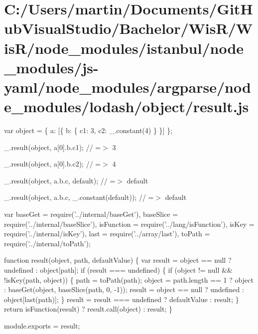 \hypertarget{_c_1_2_users_2martin_2_documents_2_git_hub_visual_studio_2_bachelor_2_wis_r_2_wis_r_2node_modulea6f0ac3c6e21bbcd1a4cde4fc1611792}{}\section{C\+:/\+Users/martin/\+Documents/\+Git\+Hub\+Visual\+Studio/\+Bachelor/\+Wis\+R/\+Wis\+R/node\+\_\+modules/istanbul/node\+\_\+modules/js-\/yaml/node\+\_\+modules/argparse/node\+\_\+modules/lodash/object/result.\+js}
var object = \{ \textquotesingle{}a\textquotesingle{}\+: \mbox{[}\{ \textquotesingle{}b\textquotesingle{}\+: \{ \textquotesingle{}c1\textquotesingle{}\+: 3, \textquotesingle{}c2\textquotesingle{}\+: \+\_\+.\+constant(4) \} \}\mbox{]} \};

\+\_\+.\+result(object, \textquotesingle{}a\mbox{[}0\mbox{]}.b.\+c1\textquotesingle{}); // =$>$ 3

\+\_\+.\+result(object, \textquotesingle{}a\mbox{[}0\mbox{]}.b.\+c2\textquotesingle{}); // =$>$ 4

\+\_\+.\+result(object, \textquotesingle{}a.\+b.\+c\textquotesingle{}, \textquotesingle{}default\textquotesingle{}); // =$>$ \textquotesingle{}default\textquotesingle{}

\+\_\+.\+result(object, \textquotesingle{}a.\+b.\+c\textquotesingle{}, \+\_\+.\+constant(\textquotesingle{}default\textquotesingle{})); // =$>$ \textquotesingle{}default\textquotesingle{}


\begin{DoxyCodeInclude}
var baseGet = require(\textcolor{stringliteral}{'../internal/baseGet'}),
    baseSlice = require(\textcolor{stringliteral}{'../internal/baseSlice'}),
    isFunction = require(\textcolor{stringliteral}{'../lang/isFunction'}),
    isKey = require(\textcolor{stringliteral}{'../internal/isKey'}),
    last = require(\textcolor{stringliteral}{'../array/last'}),
    toPath = require(\textcolor{stringliteral}{'../internal/toPath'});

\textcolor{keyword}{function} result(\textcolor{keywordtype}{object}, path, defaultValue) \{
  var result = \textcolor{keywordtype}{object} == null ? undefined : \textcolor{keywordtype}{object}[path];
  \textcolor{keywordflow}{if} (result === undefined) \{
    \textcolor{keywordflow}{if} (\textcolor{keywordtype}{object} != null && !isKey(path, \textcolor{keywordtype}{object})) \{
      path = toPath(path);
      \textcolor{keywordtype}{object} = path.length == 1 ? \textcolor{keywordtype}{object} : baseGet(\textcolor{keywordtype}{object}, baseSlice(path, 0, -1));
      result = \textcolor{keywordtype}{object} == null ? undefined : \textcolor{keywordtype}{object}[last(path)];
    \}
    result = result === undefined ? defaultValue : result;
  \}
  \textcolor{keywordflow}{return} isFunction(result) ? result.call(\textcolor{keywordtype}{object}) : result;
\}

module.exports = result;
\end{DoxyCodeInclude}
 